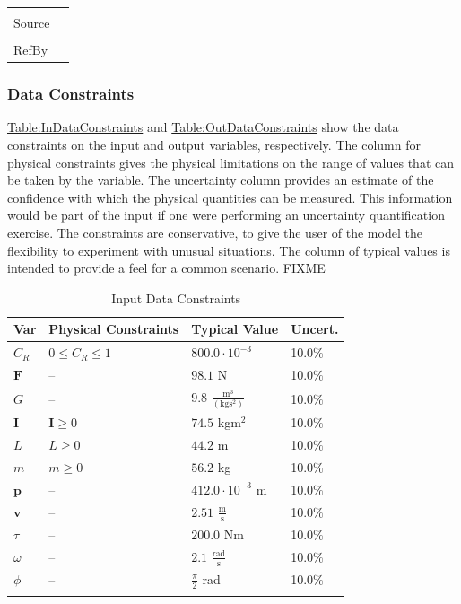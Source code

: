 \documentclass[12pt]{article}
\begin{document}
\begin{minipage}{\textwidth}
\begin{tabular}{p{} p{}}
                                                                                                   \\ \midrule \\
                                                                                                   Source & \\ \midrule \\
                                                                                                            RefBy & 
\\ \bottomrule \end{tabular}
\end{minipage}
\subsubsection{Data Constraints}
\label{Sec:DataConstraints}
\hyperref[Table:InDataConstraints]{Table:InDataConstraints} and \hyperref[Table:OutDataConstraints]{Table:OutDataConstraints} show the data constraints on the input and output variables, respectively. The column for physical constraints gives the physical limitations on the range of values that can be taken by the variable. The uncertainty column provides an estimate of the confidence with which the physical quantities can be measured. This information would be part of the input if one were performing an uncertainty quantification exercise. The constraints are conservative, to give the user of the model the flexibility to experiment with unusual situations. The column of typical values is intended to provide a feel for a common scenario. FIXME
\begin{longtable}{l l l l}
\toprule
Var & Physical Constraints & Typical Value & Uncert.
\\
\midrule
\endhead
${C_{R}}$ & $0\leq{}{C_{R}}\leq{}1$ & $800.0\cdot{}10^{-3}$ & 10.0$\%$
\\
$\mathbf{F}$ & -- & $98.1$ N & 10.0$\%$
\\
$G$ & -- & $9.8$ $\frac{\text{m}^{3}}{(\text{kg}\text{s}^{2})}$ & 10.0$\%$
\\
$\mathbf{I}$ & $\mathbf{I}\geq{}0$ & $74.5$ kg$\text{m}^{2}$ & 10.0$\%$
\\
$L$ & $L\geq{}0$ & $44.2$ m & 10.0$\%$
\\
$m$ & $m\geq{}0$ & $56.2$ kg & 10.0$\%$
\\
$\mathbf{p}$ & -- & $412.0\cdot{}10^{-3}$ m & 10.0$\%$
\\
$\mathbf{v}$ & -- & $2.51$ $\frac{\text{m}}{\text{s}}$ & 10.0$\%$
\\
$τ$ & -- & $200.0$ Nm & 10.0$\%$
\\
$ω$ & -- & $2.1$ $\frac{\text{rad}}{\text{s}}$ & 10.0$\%$
\\
$ϕ$ & -- & $\frac{π}{2}$ rad & 10.0$\%$
\\
\bottomrule
\caption{Input Data Constraints}
\label{Table:InDataConstraints}
\end{longtable}
\end{document}
